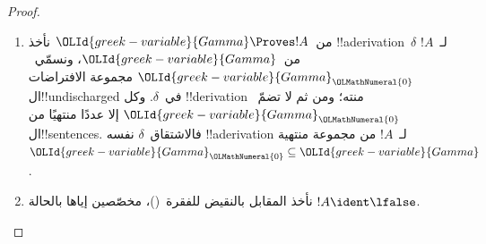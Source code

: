 \documentclass[../../../include/open-logic-section]{subfiles}
\begin{document}
\begin{proof}
  \begin{enumerate}
    \item من~${\OLId{greek-variable}{Gamma}} \Proves !A$ نأخذ !!a{derivation}~$\delta$
      لـ~$!A$ من~${\OLId{greek-variable}{Gamma}}$، ونسمّي~${\OLId{greek-variable}{Gamma}}_{\OLMathNumeral{0}}$ مجموعة الافتراضات
      ال!!{undischarged} في~$\delta$. وكل !!{derivation} منته؛ ومن ثم
      لا تضمّ~${\OLId{greek-variable}{Gamma}}_{\OLMathNumeral{0}}$ إلا عددًا منتهيًا من ال!!{sentence}s.
      فالاشتقاق~$\delta$ نفسه !!a{derivation} لـ~$!A$ من مجموعة
      منتهية~${\OLId{greek-variable}{Gamma}}_{\OLMathNumeral{0}} \subseteq {\OLId{greek-variable}{Gamma}}$.
    \item نأخذ المقابل بالنقيض للفقرة~()، مخصّصين إياها بالحالة
      $!A \ident \lfalse$.
  \end{enumerate}
\end{proof}
\end{document}
